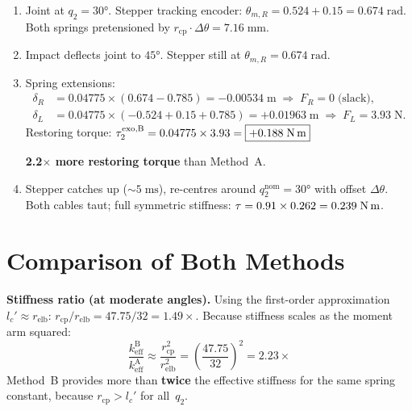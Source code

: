 \documentclass[11pt, a4paper]{article}
\begin{document}
\begin{enumerate}
    \item[\textbf{T$_0$}:] Joint at $q_2 = 30°$.  Stepper tracking
        encoder: $\theta_{m,R} = 0.524 + 0.15 = 0.674\;\text{rad}$.
        Both springs pretensioned by
        $r_{\text{cp}} \cdot \Delta\theta = 7.16\;\text{mm}$.

    \item[\textbf{T$_1$}:] Impact deflects joint to $45°$.
        Stepper still at $\theta_{m,R} = 0.674\;\text{rad}$.

    \item[\textbf{T$_2$}:] Spring extensions:
        \begin{align*}
            \delta_R &= 0.04775 \times (0.674 - 0.785)
                = -0.00534\;\text{m}
                \;\Rightarrow\; F_R = 0 \;\text{(slack)}, \\
            \delta_L &= 0.04775 \times (-0.524+0.15+0.785)
                = +0.01963\;\text{m}
                \;\Rightarrow\; F_L = 3.93\;\text{N}.
        \end{align*}
        Restoring torque:
        $\tau_2^{\text{exo,B}} = 0.04775 \times 3.93 = \boxed{+0.188\;\text{N\,m}}$

        \textbf{2.2$\times$ more restoring torque} than Method~A.

    \item[\textbf{T$_3$}:] Stepper catches up ($\sim\!5\;\text{ms}$),
        re-centres around $q_2^{\text{nom}} = 30°$ with offset $\Delta\theta$.
        Both cables taut; full symmetric stiffness:
        $\tau = 0.91 \times 0.262 = 0.239\;\text{N\,m}$.
\end{enumerate}


\section{Comparison of Both Methods}
\label{sec:comparison}

\begin{mdframed}
\textbf{Stiffness ratio (at moderate angles).}\;
Using the first-order approximation $l_c' \approx r_{\text{elb}}$:
$r_{\text{cp}}/r_{\text{elb}} = 47.75/32 = 1.49\times$.
Because stiffness scales as the moment arm squared:
\[
    \frac{k_{\text{eff}}^{\text{B}}}{k_{\text{eff}}^{\text{A}}}
    \approx \frac{r_{\text{cp}}^2}{r_{\text{elb}}^2}
    = \left(\frac{47.75}{32}\right)^{\!2}
    = 2.23\times
\]
Method~B provides more than \textbf{twice} the effective stiffness for the
same spring constant, because $r_{\text{cp}} > l_c'$ for all~$q_2$.
\end{mdframed}
\end{document}
